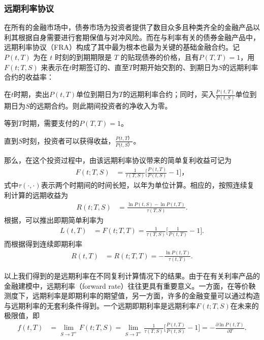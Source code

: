 \subsubsection{远期利率协议}
在所有的金融市场中，债券市场为投资者提供了数目众多且种类齐全的金融产品以利其根据自身需要进行套期保值与对冲风险。而在与利率有关的债券金融产品中，远期利率协议（FRA）构成了其中最为根本也最为关键的基础金融合约。记$P(t,T)$ 为在 $t$ 时刻的到期期限是 $T$ 的贴现债券的价格，且有$P(T,T)=1$，用 $F(t; T, S)$ 来表示在$t$时期签订的、直至$T$时期开始交割的、到期日为$S$的远期利率合约的收益率：
\begin{compactitem}
 \item 在$t$时期，卖出$P(t,T)$单位到期日为$T$的远期利率合约；同时，买入$\frac{P(t,T)}{P(t,S)}$单位到期日为$S$的远期合约。则此期间投资者的净收入为零。
 \item 等到$T$时期，需要支付的$P(T,T)=1$。
 \item 直到$S$时刻，投资者可以获得收益，$\frac{P(t,T）}{P(t,S）}$。
\end{compactitem}
那么，在这个投资过程中，由该远期利率协议带来的简单复利收益可记为
\begin{align}
F(t; T, S) &= \frac{1}{\tau(T,S)}\Big[\frac{P(t,T)}{P(t,S)} - 1 \Big]， \label{forward-spot}
\end{align}
式中$\tau(\cdot,\cdot)$表示两个时期间的时间长短，以年为单位计算。相应的，按照连续复利计算的远期收益为
\begin{align}
R(t; T, S) &= \frac{\ln P(t,S) - \ln P(t,T)}{\tau(T,S)}. \label{forward-comp}
\end{align}
根据，可以推出即期简单利率为
\begin{align}
L(t, T) &= F(t; T, T) = \frac{1}{\tau(T,S)}\Big[\frac{1}{P(t,T)} - 1 \Big].
\end{align}
而根据得到连续即期利率
\begin{align}
R(t, T) &= R(t; T, T) = -\frac{\ln P(t,T)}{\tau(t,T)}.
\end{align}

以上我们得到的是远期利率在不同复利计算情况下的结果。由于在有关利率产品的金融建模中，远期利率（forward rate）往往更具有重要意义。一方面，在等价鞅测度下，远期利率是即期利率的期望值，另一方面，许多的金融变量可以通过构造与远期利率的无套利条件得到。一个远期即期利率是远期利率$F(t; T, S)$在未来的极限值，即
\begin{align}
f(t,T) &= \lim_{S\rightarrow T^+} F(t; T, S) = \lim_{S\rightarrow T^+} \frac{1}{\tau(T,S)}\Big[\frac{P(t,T)}{P(t,S)} - 1 \Big] 
= - \frac{\partial \ln P(t,T)}{\partial T}. \label{forward}
\end{align}

